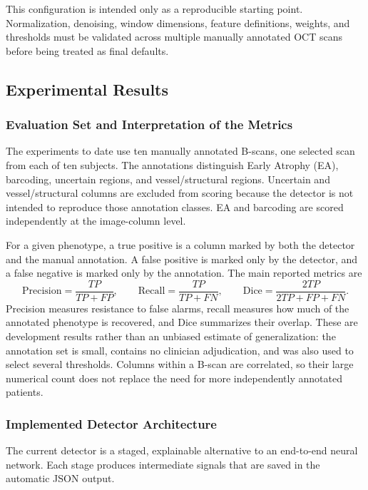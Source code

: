 \documentclass[11pt]{article}
\begin{document}
This configuration is intended only as a reproducible starting point.
Normalization, denoising, window dimensions, feature definitions, weights, and
thresholds must be validated across multiple manually annotated OCT scans before
being treated as final defaults.

\subsection{Experimental Results}

\subsubsection{Evaluation Set and Interpretation of the Metrics}

The experiments to date use ten manually annotated B-scans, one selected scan
from each of ten subjects.  The annotations distinguish Early Atrophy (EA),
barcoding, uncertain regions, and vessel/structural regions.  Uncertain and
vessel/structural columns are excluded from scoring because the detector is not
intended to reproduce those annotation classes.  EA and barcoding are scored
independently at the image-column level.

For a given phenotype, a true positive is a column marked by both the detector
and the manual annotation.  A false positive is marked only by the detector,
and a false negative is marked only by the annotation.  The main reported
metrics are
\[
\mathrm{Precision}=\frac{TP}{TP+FP},\qquad
\mathrm{Recall}=\frac{TP}{TP+FN},\qquad
\mathrm{Dice}=\frac{2TP}{2TP+FP+FN}.
\]
Precision measures resistance to false alarms, recall measures how much of the
annotated phenotype is recovered, and Dice summarizes their overlap.  These
are development results rather than an unbiased estimate of generalization:
the annotation set is small, contains no clinician adjudication, and was also
used to select several thresholds.  Columns within a B-scan are correlated, so
their large numerical count does not replace the need for more independently
annotated patients.

\subsubsection{Implemented Detector Architecture}

The current detector is a staged, explainable alternative to an end-to-end
neural network.  Each stage produces intermediate signals that are saved in
the automatic JSON output.
\end{document}
